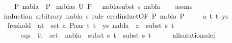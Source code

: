 \begin{isabellebody}
\ \ \ {\isachardoublequoteopen}P{}\ {\isasymturnstile}nabla{}\ {\isasymrightarrow}\ P{}{\isachardoublequoteclose}\isanewline
{}\ {\isachardoublequoteopen}{\isacharparenleft}{\kern0pt}nabla{}{\isacharcomma}{\kern0pt}s{}{\isacharparenright}{\kern0pt}{\isasymin}\ U\ P{}\ \ {\isasymand}\ {\isacharparenleft}{\kern0pt}nabla{}{\isasymTurnstile}{\isacharparenleft}{\kern0pt}subst\ s{}{\isacharparenright}{\kern0pt}\ nabla{}{\isacharparenright}{\kern0pt}{\isachardoublequoteclose}\isanewline
%
\isadelimproof
\ \ %
\endisadelimproof
%
\isatagproof
{}\isamarkupfalse%
\ assms\isanewline
{}\isamarkupfalse%
{\isacharparenleft}{\kern0pt}induction\ arbitrary{\isacharcolon}{\kern0pt}\ nabla{}\ s{}\ rule{\isacharcolon}{\kern0pt}\ c{\isacharunderscore}{\kern0pt}red{\isachardot}{\kern0pt}induct{\isacharbrackleft}{\kern0pt}OF\ {\isacartoucheopen}P{}\ {\isasymturnstile}nabla{}{\isasymrightarrow}\ P{}{\isacartoucheclose}{\isacharbrackright}{\kern0pt}{\isacharparenright}{\kern0pt}\isanewline
\ \ \isamarkupfalse%
\ {\isacharparenleft}{\kern0pt}{}\ a\ t{}\ t{}\ ys{\isacharparenright}{\kern0pt}\isanewline
\ \ \isamarkupfalse%
\ fresh{\isacharunderscore}{\kern0pt}old{\isacharcolon}{\kern0pt}\ {\isachardoublequoteopen}{\isasymforall}\ {\isacharparenleft}{\kern0pt}a{\isacharcomma}{\kern0pt}t{\isacharparenright}{\kern0pt}\ {\isasymin}\ set\ {\isacharparenleft}{\kern0pt}{\isacharparenleft}{\kern0pt}a{\isacharcomma}{\kern0pt}\ Paar\ t{}\ t{}{\isacharparenright}{\kern0pt}\ {\isacharhash}{\kern0pt}\ ys{\isacharparenright}{\kern0pt}{\isachardot}{\kern0pt}\ nabla{}\ {\isasymturnstile}\ a\ {\isasymsharp}\ subst\ s{}\ t{\isachardoublequoteclose}\isanewline
\ \ \ \ \ eqs{\isacharcolon}{\kern0pt}\ {\isachardoublequoteopen}{\isasymforall}\ {\isacharparenleft}{\kern0pt}t{}{\isacharcomma}{\kern0pt}t{}{\isacharparenright}{\kern0pt}\ {\isasymin}\ set\ {\isacharbrackleft}{\kern0pt}{\isacharbrackright}{\kern0pt}{\isachardot}{\kern0pt}\ nabla{}\ {\isasymturnstile}\ subst\ s{}\ t{}\ {\isasymapprox}\ subst\ s{}\ t{}{\isachardoublequoteclose}\isanewline
\ \ \ \ \isamarkupfalse%
\ all{\isacharunderscore}{\kern0pt}solutions{\isacharunderscore}{\kern0pt}def\ \isamarkupfalse%

\end{isabellebody}
